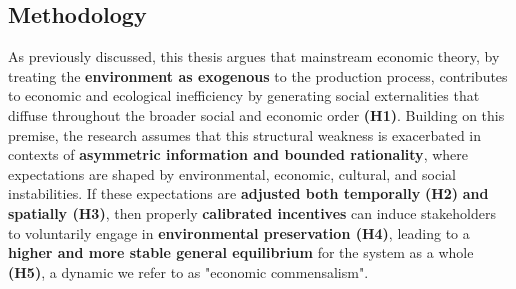 \subsection{Methodology}

As previously discussed, this thesis argues that mainstream economic theory, by treating the \textbf{environment as exogenous} to the production process, contributes to economic and ecological inefficiency by generating social externalities that diffuse throughout the broader social and economic order \textbf{(H1)}. Building on this premise, the research assumes that this structural weakness is exacerbated in contexts of \textbf{asymmetric information and bounded rationality}, where expectations are shaped by environmental, economic, cultural, and social instabilities. If these expectations are\textbf{ adjusted both temporally} \textbf{(H2)}\textbf{ and spatially (H3)}, then properly \textbf{calibrated incentives} can induce stakeholders to voluntarily engage in \textbf{environmental preservation (H4)}, leading to a \textbf{higher and more stable general equilibrium} for the system as a whole \textbf{(H5)}, a dynamic we refer to as "economic commensalism".

